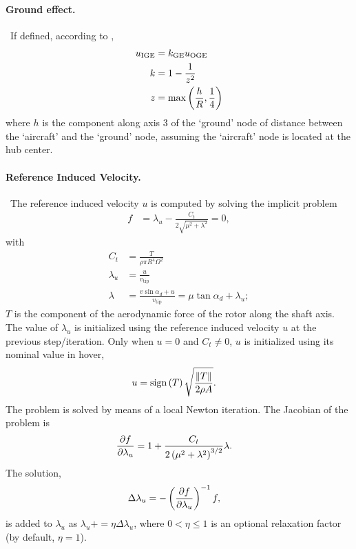 \paragraph{Ground effect.} \
If defined, according to \cite{CHEESEMAN-BENNETT-1955},
\begin{subequations}
\begin{align}
	u_\text{IGE}
	&=
	k_\text{GE} u_\text{OGE}
	\\
	k
	&=
	1 - \frac{1}{z^2}
	\\
	z
	&= \max\left( \frac{h}{R}, \frac{1}{4} \right)
\end{align}
\end{subequations}
where $h$ is the component along axis 3 of the `ground' node
of distance between the `aircraft' and the `ground' node,
assuming the `aircraft' node is located at the hub center.

\paragraph{Reference Induced Velocity.} \
The reference induced velocity $u$ is computed by solving the implicit problem
\begin{align}
	f
	&=
	\lambda_u
	- \frac{C_t}{2\sqrt{\mu^2 + \lambda^2}}
	=
	0
	,
\end{align}
with
\begin{subequations}
\begin{align}
	C_t
	&=
	\frac{T}{\rho \pi R^4 \Omega^2}
	\\
	\lambda_u
	&=
	\frac{u}{v_\text{tip}}
	\\
	\lambda
	&=
	\frac{v \sin\alpha_d + u}{v_\text{tip}}
	=
	\mu \tan\alpha_d
	+ \lambda_u
	;
\end{align}
\end{subequations}
$T$ is the component of the aerodynamic force of the rotor
along the shaft axis.
The value of $\lambda_u$ is initialized using the reference induced velocity
$u$ at the previous step/iteration.
Only when $u=0$ and $C_t\neq 0$, $u$ is initialized using its nominal value
in hover,
\begin{align}
	u
	&=
	\text{sign}\left( T \right) \sqrt{\frac{\left\| T \right\|}{2 \rho A}}
	.
\end{align}
The problem is solved by means of a local Newton iteration.
The Jacobian of the problem is
\begin{align}
	\frac{\partial f}{\partial \lambda_u}
	&=
	1 + \frac{C_t}{2 \left( \mu^2 + \lambda^2 \right)^{3/2}} \lambda
	.
\end{align}
The solution,
\begin{align}
	\Delta\lambda_u
	&=
	- \left( \frac{\partial f}{\partial \lambda_u} \right)^{-1} f
	,
\end{align}
is added to $\lambda_u$ as
$\lambda_u += \eta \Delta\lambda_u$,
where $0 < \eta \le 1$ is an optional relaxation factor
(by default, $\eta=1$).

